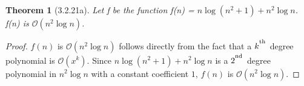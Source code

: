 \documentclass[a4paper, 12pt]{article}
\theoremstyle{plain}
\newtheorem*{theorem*}{Theorem}
\begin{document}
	
	\begin{theorem*}[3.2.21a]
		Let f be the function f(n) = $n \log(n^2 + 1) + n^2 \log n$. \newline f(n) is $\mathcal{O}(n^2 \log n)$.
	\end{theorem*}
	
	\begin{proof}
		$f(n)$ is $\mathcal{O}(n^2 \log n)$ follows directly from the fact that a $k^\textsuperscript{th}$ degree polynomial is $\mathcal{O}(x^k)$. Since $n \log(n^2 + 1) + n^2 \log n$ is a $2^\textsuperscript{nd}$ degree polynomial in $n^2 \log n$ with a constant coefficient $1$, $f(n)$ is $\mathcal{O}(n^2 \log n)$.
	\end{proof}
\end{document}
